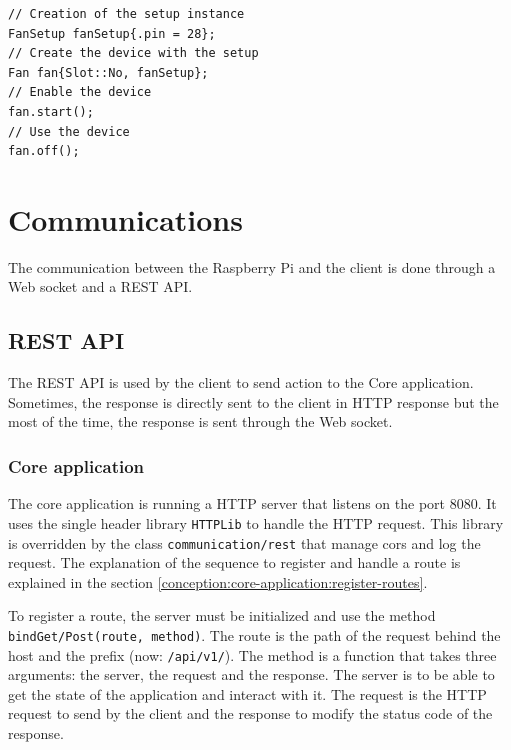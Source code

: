 \begin{code}
  \label{code:implementation:sec:devices:add-device}
  \begin{verbatim}
// Creation of the setup instance
FanSetup fanSetup{.pin = 28};
// Create the device with the setup
Fan fan{Slot::No, fanSetup};
// Enable the device
fan.start();
// Use the device
fan.off();
  \end{verbatim}
\end{code}


\section{Communications}
\label{ch:implementation:sec:communications}

The communication between the Raspberry Pi and the client is done through a Web socket and a REST API.

\subsection{REST API}
\label{ch:implementation:sec:communications:rest-api}

The REST API is used by the client to send action to the Core application.
Sometimes, the response is directly sent to the client in HTTP response but the most of the time, the response is sent through the Web socket.

\subsubsection{Core application}
\label{ch:implementation:sec:communications:rest-api:core}

The core application is running a HTTP server that listens on the port 8080.
It uses the single header library \texttt{HTTPLib} to handle the HTTP request.
This library is overridden by the class \texttt{communication/rest} that manage \acrshort{cors} and log the request.
The explanation of the sequence to register and handle a route is explained in the section \ref{conception:core-application:register-routes}.

To register a route, the server must be initialized and use the method \texttt{bindGet/Post(route, method)}.
The route is the path of the request behind the host and the prefix (now: \texttt{/api/v1/}).
The method is a function that takes three arguments: the server, the request and the response.
The server is to be able to get the state of the application and interact with it.
The request is the HTTP request to send by the client and the response to modify the status code of the response.

